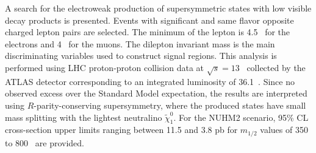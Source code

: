 A search for the electroweak production of supersymmetric states with low \pt visible decay products is presented.
Events with significant \met and same flavor opposite charged lepton pairs are selected.
The minimum \pt of the lepton is 4.5~{\GeV} for the electrons and 4~{\GeV} for the muons.
The dilepton invariant mass is the main discriminating variables used to construct signal regions.
This analysis is performed using LHC proton-proton collision data at $\sqrt{s} = 13$~{\TeV} collected by the ATLAS detector corresponding to an integrated luminosity of 36.1~\ifb.
Since no observed excess over the Standard Model expectation, the results are interpreted using $R$-parity-conserving supersymmetry, where the produced states have small mass splitting with the lightest neutralino $\widetilde{\chi}^{0}_{1}$.
For the NUHM2 scenario, 95\% CL cross-section upper limits ranging between 11.5 and 3.8 pb for $m_{1/2}$ values of 350 to 800~{\GeV} are provided.
